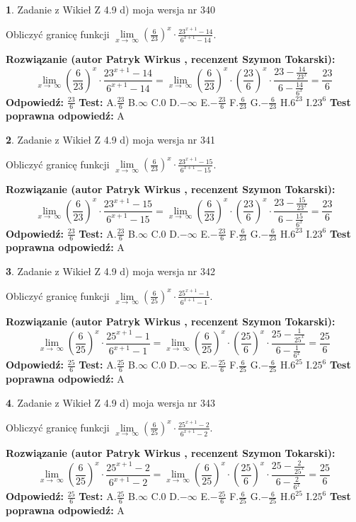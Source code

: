 \documentclass[12pt, a4paper]{article}
\theoremstyle{definition} %
\newtheorem{zad}{}
\newcommand{\zadStart}[1]{\begin{zad}#1\newline}
\newcommand{\zadStop}{\end{zad}}
\newcommand{\rozwStart}[2]{\noindent \textbf{Rozwiązanie (autor #1 , recenzent #2): }\newline}
\newcommand{\rozwStop}{\newline}
\newcommand{\odpStart}{\noindent \textbf{Odpowiedź:}\newline}
\newcommand{\odpStop}{\newline}
\newcommand{\testStart}{\noindent \textbf{Test:}\newline}
\newcommand{\testStop}{\newline}
\newcommand{\kluczStart}{\noindent \textbf{Test poprawna odpowiedź:}\newline}
\newcommand{\kluczStop}{\newline}
\begin{document}
\zadStart{Zadanie z Wikieł Z 4.9 d) moja wersja nr 340}


Obliczyć granicę funkcji  $\lim\limits_{x\to\ \infty}(\frac{6}{23})^{x}\cdot\frac{23^{x+1}-14}{6^{x+1}-14}$.
\zadStop
\rozwStart{Patryk Wirkus}{Szymon Tokarski}
$$\lim\limits_{x\to\ \infty}(\frac{6}{23})^{x}\cdot\frac{23^{x+1}-14}{6^{x+1}-14}=\lim\limits_{x\to\ \infty}(\frac{6}{23})^{x}\cdot(\frac{23}{6})^{x} \cdot \frac{23-\frac{14}{23^{x}}}{6-\frac{14}{6^{x}}} = \frac{23}{6}$$
\rozwStop
\odpStart
$\frac{23}{6}$
\odpStop
\testStart
A.$\frac{23}{6}$ B.$\infty$ C.$0$ D.$-\infty$ E.$-\frac{23}{6}$
F.$\frac{6}{23}$ G.$-\frac{6}{23}$
H.$6^{23}$
I.$23^{6}$
\testStop
\kluczStart
A
\kluczStop



\zadStart{Zadanie z Wikieł Z 4.9 d) moja wersja nr 341}


Obliczyć granicę funkcji  $\lim\limits_{x\to\ \infty}(\frac{6}{23})^{x}\cdot\frac{23^{x+1}-15}{6^{x+1}-15}$.
\zadStop
\rozwStart{Patryk Wirkus}{Szymon Tokarski}
$$\lim\limits_{x\to\ \infty}(\frac{6}{23})^{x}\cdot\frac{23^{x+1}-15}{6^{x+1}-15}=\lim\limits_{x\to\ \infty}(\frac{6}{23})^{x}\cdot(\frac{23}{6})^{x} \cdot \frac{23-\frac{15}{23^{x}}}{6-\frac{15}{6^{x}}} = \frac{23}{6}$$
\rozwStop
\odpStart
$\frac{23}{6}$
\odpStop
\testStart
A.$\frac{23}{6}$ B.$\infty$ C.$0$ D.$-\infty$ E.$-\frac{23}{6}$
F.$\frac{6}{23}$ G.$-\frac{6}{23}$
H.$6^{23}$
I.$23^{6}$
\testStop
\kluczStart
A
\kluczStop



\zadStart{Zadanie z Wikieł Z 4.9 d) moja wersja nr 342}


Obliczyć granicę funkcji  $\lim\limits_{x\to\ \infty}(\frac{6}{25})^{x}\cdot\frac{25^{x+1}-1}{6^{x+1}-1}$.
\zadStop
\rozwStart{Patryk Wirkus}{Szymon Tokarski}
$$\lim\limits_{x\to\ \infty}(\frac{6}{25})^{x}\cdot\frac{25^{x+1}-1}{6^{x+1}-1}=\lim\limits_{x\to\ \infty}(\frac{6}{25})^{x}\cdot(\frac{25}{6})^{x} \cdot \frac{25-\frac{1}{25^{x}}}{6-\frac{1}{6^{x}}} = \frac{25}{6}$$
\rozwStop
\odpStart
$\frac{25}{6}$
\odpStop
\testStart
A.$\frac{25}{6}$ B.$\infty$ C.$0$ D.$-\infty$ E.$-\frac{25}{6}$
F.$\frac{6}{25}$ G.$-\frac{6}{25}$
H.$6^{25}$
I.$25^{6}$
\testStop
\kluczStart
A
\kluczStop



\zadStart{Zadanie z Wikieł Z 4.9 d) moja wersja nr 343}


Obliczyć granicę funkcji  $\lim\limits_{x\to\ \infty}(\frac{6}{25})^{x}\cdot\frac{25^{x+1}-2}{6^{x+1}-2}$.
\zadStop
\rozwStart{Patryk Wirkus}{Szymon Tokarski}
$$\lim\limits_{x\to\ \infty}(\frac{6}{25})^{x}\cdot\frac{25^{x+1}-2}{6^{x+1}-2}=\lim\limits_{x\to\ \infty}(\frac{6}{25})^{x}\cdot(\frac{25}{6})^{x} \cdot \frac{25-\frac{2}{25^{x}}}{6-\frac{2}{6^{x}}} = \frac{25}{6}$$
\rozwStop
\odpStart
$\frac{25}{6}$
\odpStop
\testStart
A.$\frac{25}{6}$ B.$\infty$ C.$0$ D.$-\infty$ E.$-\frac{25}{6}$
F.$\frac{6}{25}$ G.$-\frac{6}{25}$
H.$6^{25}$
I.$25^{6}$
\testStop
\kluczStart
A
\kluczStop
\end{document}

